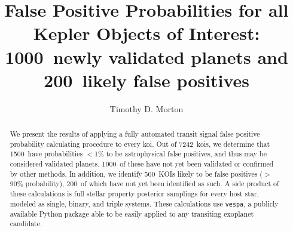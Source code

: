 \documentclass{emulateapj}
\newcommand{\ncalc}{7242}
\newcommand{\nval}{1500}
\newcommand{\nvalnew}{1000}
\newcommand{\nfp}{500}
\newcommand{\nfpnew}{200}
\newcommand{\vespa}{\texttt{vespa}}
\begin{document}

\title{False Positive Probabilities for all Kepler Objects of Interest: \\
        \nvalnew\ newly validated planets and \nfpnew\ likely false positives}


\author{Timothy D. Morton}



\begin{abstract}
We present the results of applying a fully automated transit signal
false positive probability calculating procedure to every \ac{koi}.
Out of \ncalc\ \acp{koi}, we determine that \nval\ have probabilities
$<$1\% to be astrophysical false positives, and thus may be considered
validated planets.  \nvalnew\ of these have not yet been validated or
confirmed by other methods.  In addition, we identify \nfp\ KOIs
likely to be false positives ($>$90\% probability), \nfpnew\ of which
have not yet been identified as such. A side product of these
calculations is full stellar property posterior samplings for every
host star, modeled as single, binary, and triple systems.  These
calculations use \vespa, a publicly available Python package able to
be easily applied to any transiting exoplanet candidate.
\end{abstract}

\end{document}
